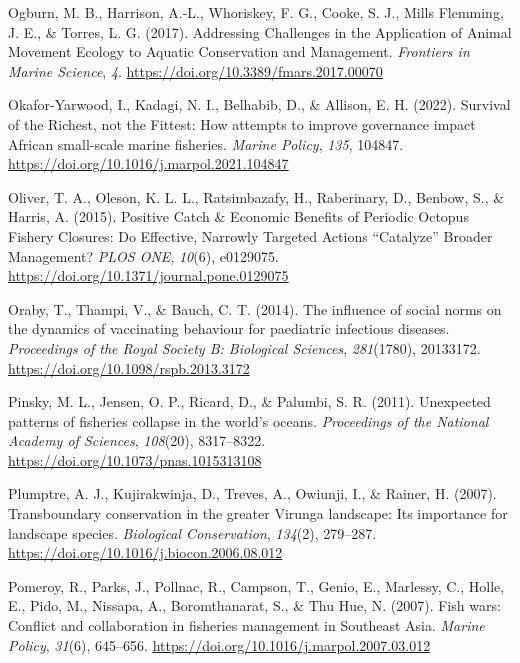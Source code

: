 \documentclass[
]{article}
\newlength{\cslhangindent}
\newlength{\cslentryspacingunit} %
\newenvironment{CSLReferences}[2] %
 {%
  \setlength{\parindent}{0pt}
  \ifodd #1
  \let\oldpar\par
  \def\par{\hangindent=\cslhangindent\oldpar}
  \fi
  \setlength{\parskip}{#2\cslentryspacingunit}
 }%
 {}
\begin{document}
\begin{CSLReferences}{1}{0}
\leavevmode{}%
Ogburn, M. B., Harrison, A.-L., Whoriskey, F. G., Cooke, S. J., Mills Flemming, J. E., \& Torres, L. G. (2017). Addressing {Challenges} in the {Application} of {Animal} {Movement} {Ecology} to {Aquatic} {Conservation} and {Management}. \emph{Frontiers in Marine Science}, \emph{4}. \url{https://doi.org/10.3389/fmars.2017.00070}

\leavevmode{}%
Okafor-Yarwood, I., Kadagi, N. I., Belhabib, D., \& Allison, E. H. (2022). Survival of the {Richest}, not the {Fittest}: {How} attempts to improve governance impact {African} small-scale marine fisheries. \emph{Marine Policy}, \emph{135}, 104847. \url{https://doi.org/10.1016/j.marpol.2021.104847}

\leavevmode{}%
Oliver, T. A., Oleson, K. L. L., Ratsimbazafy, H., Raberinary, D., Benbow, S., \& Harris, A. (2015). Positive {Catch} \& {Economic} {Benefits} of {Periodic} {Octopus} {Fishery} {Closures}: {Do} {Effective}, {Narrowly} {Targeted} {Actions} {``{Catalyze}''} {Broader} {Management}? \emph{PLOS ONE}, \emph{10}(6), e0129075. \url{https://doi.org/10.1371/journal.pone.0129075}

\leavevmode{}%
Oraby, T., Thampi, V., \& Bauch, C. T. (2014). The influence of social norms on the dynamics of vaccinating behaviour for paediatric infectious diseases. \emph{Proceedings of the Royal Society B: Biological Sciences}, \emph{281}(1780), 20133172. \url{https://doi.org/10.1098/rspb.2013.3172}

\leavevmode{}%
Pinsky, M. L., Jensen, O. P., Ricard, D., \& Palumbi, S. R. (2011). Unexpected patterns of fisheries collapse in the world's oceans. \emph{Proceedings of the National Academy of Sciences}, \emph{108}(20), 8317--8322. \url{https://doi.org/10.1073/pnas.1015313108}

\leavevmode{}%
Plumptre, A. J., Kujirakwinja, D., Treves, A., Owiunji, I., \& Rainer, H. (2007). Transboundary conservation in the greater {Virunga} landscape: {Its} importance for landscape species. \emph{Biological Conservation}, \emph{134}(2), 279--287. \url{https://doi.org/10.1016/j.biocon.2006.08.012}

\leavevmode{}%
Pomeroy, R., Parks, J., Pollnac, R., Campson, T., Genio, E., Marlessy, C., Holle, E., Pido, M., Nissapa, A., Boromthanarat, S., \& Thu Hue, N. (2007). Fish wars: {Conflict} and collaboration in fisheries management in {Southeast} {Asia}. \emph{Marine Policy}, \emph{31}(6), 645--656. \url{https://doi.org/10.1016/j.marpol.2007.03.012}


\end{CSLReferences}
\end{document}
